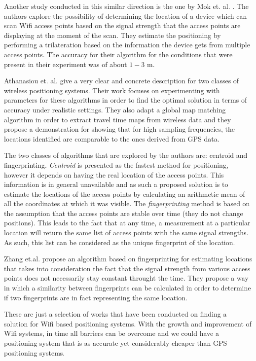 Another study conducted in this similar direction is the one by Mok et. al.
\cite{mok2007location}. The authors explore the possibility of determining the
location of a device which can scan Wifi access points based on the signal
strength that the access points are displaying at the moment of the scan. They
estimate the positioning by performing a trilateration based on the information
the device gets from multiple access points. The accuracy for their algorithm
for the conditions that were present in their experiment was of about $1-3$ m.

Athanasiou et. al. \cite{athanasiou2009utilizing} give a very clear and
concrete description for two classes of wireless positioning systems. Their work
focuses on experimenting with parameters for these algorithms in order to find
the optimal solution in terms of accuracy under realistic settings. They also
adapt a global map matching algorithm in order to extract travel time maps from
wireless data and they propose a demonstration for showing that for high
sampling frequencies, the locations identified are comparable to the ones
derived from GPS data.

The two classes of algorithms that are explored by the authors are: centroid and
fingerprinting. \textit{Centroid} is presented as the fastest method for
positioning, however it depends on having the real location of the access
points. This information is in general unavailable and as such a proposed
solution is to estimate the locations of the access points by calculating an
arithmetic mean of all the coordinates at which it was visible. The
\textit{fingerprinting} method is based on the assumption that the access points
are stable over time (they do not change positions). This leads to the fact that
at any time, a measurement at a particular location will return the same list of
access points with the same signal strengths. As such, this list can be
considered as the unique fingerprint of the location.

Zhang et.al. \cite{zhang2012polaris} propose an algorithm based on
fingerprinting for estimating locations that takes into consideration the fact
that the signal strength from various access points does not necessarily stay
constant throught the time. They propose a way in which a similarity between
fingerprints can be calculated in order to determine if two fingerprints are in
fact representing the same location.

These are just a selection of works that have been conducted on finding a
solution for Wifi based positioning systems. With the growth and improvement of
Wifi systems, in time all barriers can be overcome and we could have a
positioning system that is as accurate yet considerably cheaper than GPS
positioning systems.


